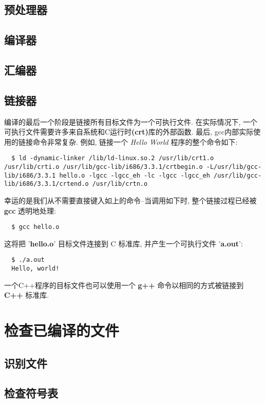 \documentclass[lang=cn,12pt,newtx,scheme=chinese]{elegantbook}
\begin{document}
\section{预处理器}
\section{编译器}
\section{汇编器}
\section{链接器}
编译的最后一个阶段是链接所有目标文件为一个可执行文件. 在实际情况下, 一个可执行文件需要许多来自系统和C运行时\textbf{(crt)}库的外部函数. 最后, gcc内部实际使用的链接命令非常复杂. 例如, 链接一个 \textit{Hello World} 程序的整个命令如下:
\begin{lstlisting}
  $ ld -dynamic-linker /lib/ld-linux.so.2 /usr/lib/crt1.o /usr/lib/crti.o /usr/lib/gcc-lib/i686/3.3.1/crtbegin.o -L/usr/lib/gcc-lib/i686/3.3.1 hello.o -lgcc -lgcc_eh -lc -lgcc -lgcc_eh /usr/lib/gcc-lib/i686/3.3.1/crtend.o /usr/lib/crtn.o
\end{lstlisting}

  幸运的是我们从不需要直接键入如上的命令--当调用如下时, 整个链接过程已经被 \textbf{gcc} 透明地处理: 

\begin{lstlisting}
  $ gcc hello.o
\end{lstlisting}

  这将把 '\textbf{hello.o}' 目标文件连接到 C 标准库, 并产生一个可执行文件 '\textbf{a.out}':

\begin{lstlisting}
  $ ./a.out
  Hello, world!
\end{lstlisting}

  一个C++程序的目标文件也可以使用一个 \textbf{g++} 命令以相同的方式被链接到 \textbf{C++} 标准库.

\chapter{检查已编译的文件}
\section{识别文件}
\section{检查符号表}
\end{document}
